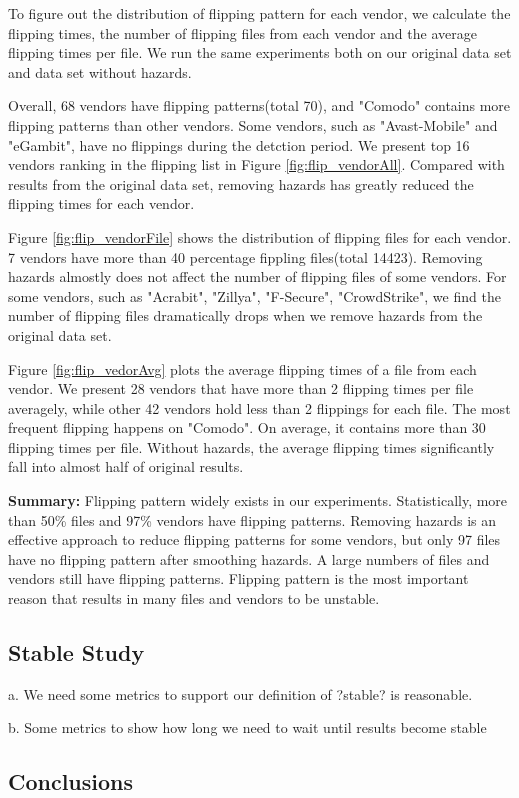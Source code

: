 
To figure out the distribution of flipping pattern for each vendor, we calculate the flipping times, the number of flipping files from each vendor and the average flipping times per file. We run the same experiments both on our original data set and data set without hazards.

Overall, 68 vendors have flipping patterns(total 70), and "Comodo" contains more flipping patterns than other vendors. Some vendors, such as "Avast-Mobile" and "eGambit", have no flippings during the detction period. We present top 16 vendors ranking in the flipping list in Figure \ref{fig:flip_vendorAll}. Compared with results from the original data set, removing hazards has greatly reduced the flipping times for each vendor. 

Figure \ref{fig:flip_vendorFile} shows the distribution of flipping files for each vendor. 7 vendors have more than 40 percentage fippling files(total 14423). Removing hazards almostly does not affect the number of flipping files of some vendors. For some vendors, such as "Acrabit", "Zillya", "F-Secure", "CrowdStrike", we find the number of flipping files dramatically drops when we remove hazards from the original data set.

Figure \ref{fig:flip_vedorAvg} plots the average flipping times of a file from each vendor. We present 28 vendors that have more than 2 flipping times per file averagely, while other 42 vendors hold less than 2 flippings for each file. The most frequent flipping happens on "Comodo". On average, it contains more than 30 flipping times per file. Without hazards, the average flipping times significantly fall into almost half of original results. 



\textbf{Summary:} Flipping pattern widely exists in our experiments. Statistically, more than 50\% files and 97\% vendors have flipping patterns. Removing hazards is an effective approach to reduce flipping patterns for some vendors, but only 97 files have no flipping pattern after smoothing hazards. A large numbers of files and vendors still have flipping patterns. Flipping pattern is the most important reason that results in many files and vendors to be unstable.


\subsection{Stable Study}
a. We need some metrics to support our definition of ?stable? is reasonable.

b. Some metrics to show how long we need to wait until results become stable

\subsection{Conclusions}
